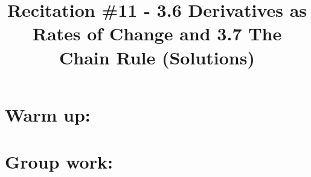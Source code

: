 \documentclass[nooutcomes]{ximera}
\title{Recitation \#11 - 3.6 Derivatives as Rates of Change and 3.7 The Chain Rule (Solutions)}
\begin{document}
\begin{abstract}		\end{abstract}
\maketitle

\section*{Warm up:} 

	\begin{freeResponse}
	
	\end{freeResponse}	
	
	
	
	
	

\section*{Group work:}



\begin{problem}
		\begin{freeResponse}
		
		\end{freeResponse}
			
			
	
\end{problem}
















\begin{problem}

			\begin{freeResponse}
			
			\end{freeResponse}
			
			
			
		
\end{problem}
	
	
	
	
	
	
	
	
			
			

\begin{problem}

		\begin{freeResponse}
		
		\end{freeResponse}
		
		
		
	
		
\end{problem}
\end{document}
